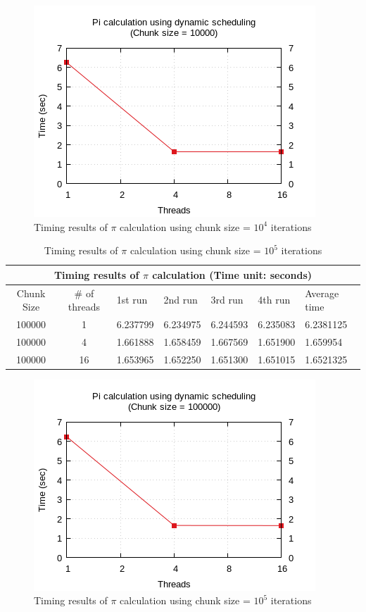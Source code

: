 \documentclass{article}
\begin{document}
\begin{figure}[htbp]
  \centering
  \includegraphics[width=0.55\columnwidth]{../../hw1/ex1/plots/pi_c10000.png}
  \caption{Timing results of $\pi$ calculation using chunk size = $10^4$ iterations}
\end{figure}



\begin{table}[htbp]
  \centering
    \begin{tabular}{|c c||l l l l| l|} 
    \hline
    \multicolumn{7}{|c|}{Timing results of $\pi$ calculation (Time unit: seconds)} \\
    \hline
    Chunk Size & \# of threads & 1st run & 2nd run & 3rd run & 4th run & Average time\\ [0.5ex] 
    \hline\hline
    100000 & 1 & 6.237799 & 6.234975 & 6.244593 & 6.235083 & 6.2381125 \\
    \hline
    100000 & 4 & 1.661888 & 1.658459 & 1.667569 & 1.651900 & 1.659954 \\
    \hline
    100000 & 16 & 1.653965 & 1.652250 & 1.651300 & 1.651015 & 1.6521325 \\ [1ex]
    \hline
    \end{tabular}
  \caption{Timing results of $\pi$ calculation using chunk size = $10^5$ iterations}
\end{table}

\begin{figure}[htbp]
  \centering
  \includegraphics[width=0.55\columnwidth]{../../hw1/ex1/plots/pi_c100000.png}
  \caption{Timing results of $\pi$ calculation using chunk size = $10^5$ iterations}
\end{figure}
\end{document}
